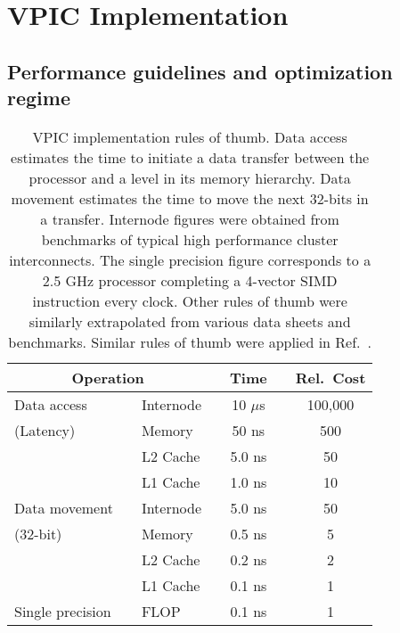 \documentclass[letter,10pt]{article}
\begin{document}
\section{VPIC Implementation}

\subsection{Performance guidelines and optimization regime}

\begin{table}
\caption{\label{tbl:Rules_of_thumb}
VPIC implementation rules of thumb.  Data access estimates the time to
initiate a data transfer between the processor and a level in its
memory hierarchy.  Data movement estimates the time to move the next
32-bits in a transfer.  Internode figures were obtained from
benchmarks of typical high performance cluster interconnects.  The
single precision figure corresponds to a 2.5 GHz processor completing
a 4-vector SIMD instruction every clock.  Other rules of thumb were
similarly extrapolated from various data sheets and benchmarks.
Similar rules of thumb were applied in Ref.~\cite{Bowers_et_al_2006}.}

\begin{center}
\begin{tabular}{l l l c c c c}
\hline
\hline
\multicolumn{3}{c}{Operation} & \hspace{18pt} & Time & \hspace{18pt} & Rel.~Cost \\
\hline
Data access      & \hspace{9pt} & Internode & & 10 $\mu$s & & 100,000 \\
(Latency)        & & Memory    & & 50 ns     & & 500     \\
                 & & L2 Cache  & & 5.0 ns    & & 50      \\
\vspace{4pt}     & & L1 Cache  & & 1.0 ns    & & 10      \\
Data movement    & & Internode & & 5.0 ns    & & 50      \\
(32-bit)         & & Memory    & & 0.5 ns    & & 5       \\
                 & & L2 Cache  & & 0.2 ns    & & 2       \\
\vspace{4pt}     & & L1 Cache  & & 0.1 ns    & & 1       \\
Single precision & & FLOP      & & 0.1 ns    & & 1       \\
\hline
\hline
\end{tabular}
\end{center}
\end{table}
\end{document}
